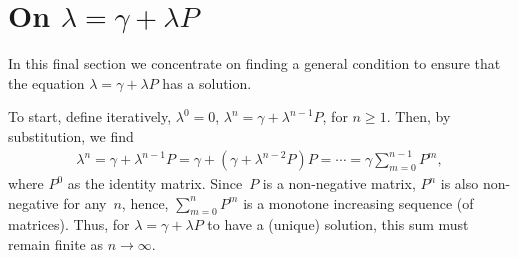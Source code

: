 \documentclass[stochastic-or.tex]{subfiles}
\begin{document}
\section{On $\lambda = \gamma + \lambda P$}
\label{sec:lambda-=-gamma}

In this final section we concentrate on finding a general condition to ensure that the equation $\lambda = \gamma + \lambda P$ has a solution.


To start, define iteratively, $\lambda^0 = 0$, $\lambda^n = \gamma + \lambda^{n-1}P$, for $n\geq 1$.
Then, by substitution, we find
\begin{align*}
  \lambda^n = \gamma + \lambda^{n-1} P = \gamma + (\gamma + \lambda^{n-2}P) P = \cdots = \gamma \sum_{m=0}^{n-1} P^m,
\end{align*}
where $P^0$ as the identity matrix.
Since~$P$ is a non-negative matrix, $P^n$ is also non-negative for any~$n$, hence, $\sum_{m=0}^n P^m$ is a monotone increasing sequence (of matrices).
Thus, for $\lambda=\gamma + \lambda P$ to have a (unique) solution, this sum must remain finite as $n\to \infty$.
\end{document}
